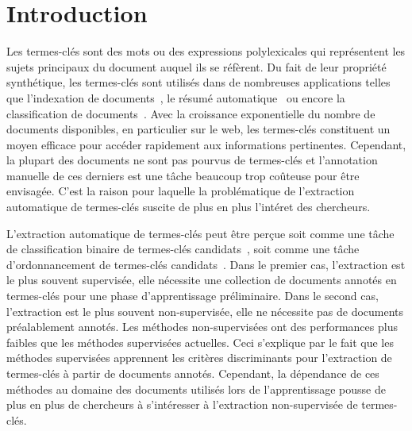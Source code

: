 \section{Introduction}
\label{sec:introduction}
  Les termes-clés sont des mots ou des expressions polylexicales qui représentent les sujets principaux du document auquel ils se réfèrent.
  Du fait de leur propriété synthétique, les termes-clés sont utilisés dans de nombreuses applications telles que l'indexation de documents~\cite{medelyan2008smalltrainingset}, le résumé automatique~\cite{litvak2008graphbased} ou encore la classification de documents~\cite{han2007webdocumentclustering}.
  Avec la croissance exponentielle du nombre de documents disponibles, en particulier sur le web, les termes-clés constituent un moyen efficace pour accéder rapidement aux informations pertinentes.
  Cependant, la plupart des documents ne sont pas pourvus de termes-clés et l'annotation manuelle de ces derniers est une tâche beaucoup trop coûteuse pour être envisagée.
  C'est la raison pour laquelle la problématique de l'extraction automatique de termes-clés suscite de plus en plus l'intéret des chercheurs.

  L'extraction automatique de termes-clés peut être perçue soit comme une tâche
  de classification binaire de termes-clés candidats~\cite{witten1999kea}, soit
  comme une tâche d'ordonnancement de termes-clés
  candidats~\cite{mihalcea2004textrank}. Dans le premier cas, l'extraction est
  le plus souvent supervisée, elle nécessite une collection de documents annotés
  en termes-clés pour une phase d'apprentissage préliminaire. Dans le second
  cas, l'extraction est le plus souvent non-supervisée, elle ne nécessite pas de
  documents préalablement annotés. Les méthodes non-supervisées ont des
  performances plus faibles que les méthodes supervisées actuelles. Ceci
  s'explique par le fait que les méthodes supervisées apprennent les critères
  discriminants pour l'extraction de termes-clés à partir de documents annotés.
  Cependant, la dépendance de ces méthodes au domaine des documents utilisés
  lors de l'apprentissage pousse de plus en plus de chercheurs à s'intéresser à
  l'extraction non-supervisée de termes-clés.

